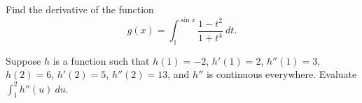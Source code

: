 \documentclass[12pt, addpoints]{exam/exam}
\newcommand{\1}{^{-1}}
\theoremstyle{plain}
\begin{document}
\begin{questions}
	
\question[2]%
Find the derivative of the function
\[
g(x)=\int_1^{\sin x}\frac{1-t^2}{1+t^4}\ dt.
\] 	
\vspace{5pc}

\question[2]%
Suppose $h$ is a function such that $h(1)=-2$, $h'(1)=2$, $h''(1)=3$, $h(2)=6$, $h'(2)=5$, $h''(2)=13$, and $h''$ is continuous everywhere.  Evaluate $\int_1^2h''(u)\ du$.

\end{questions}
\end{document}

